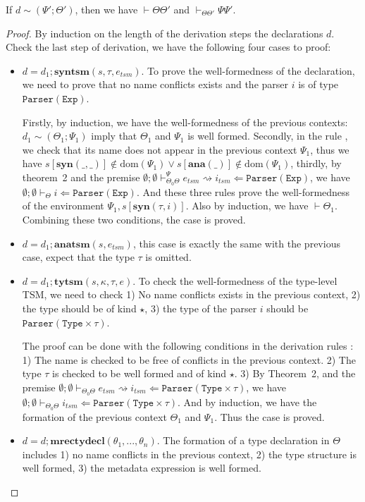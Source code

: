 \documentclass{sig-alternate}
\begin{document}
\begin{lemma} If $d\sim(\Psi';\Theta')$, then we have $\vdash\Theta\Theta'$ and $\vdash_{\Theta\Theta'}\Psi\Psi'$.
\end{lemma}
\begin{proof}
By induction on the length of the derivation steps the declarations $d$. Check the last step of derivation, we have the following four cases to proof:
\begin{itemize}
\item $d=d_1;\mathbf{syntsm}(s,\tau,e_{tsm})$. To prove the well-formedness of the declaration, we need to prove that no name conflicts exists and the parser $i$ is of type $\mathtt{Parser}(\mathtt{Exp})$. 

Firstly, by induction, we have the well-formedness of the previous contexts: $d_1\sim(\Theta_1;\Psi_1)$ imply that $\Theta_1$ and $\Psi_1$ is well formed. Secondly, in the rule , we check that its name does not appear in the previous context $\Psi_1$, thus we have $s[\mathbf{syn}(\_,\_)]\notin\text{dom}(\Psi_1)\lor s[\mathbf{ana}(\_)]\notin\text{dom}(\Psi_1)$, thirdly, by theorem~2 and the premise $\emptyset;\emptyset\vdash_{\Theta_0\Theta}^{\Psi}e_{tsm}\rightsquigarrow i_{tsm} \Leftarrow \mathtt{Parser(Exp)}$, we have $\emptyset;\emptyset\vdash_{\Theta}i\Leftarrow\mathtt{Parser}(\mathtt{Exp})$. And these three rules prove the well-formedness of the environment $\Psi_1,s[\mathbf{syn}(\tau,i)]$. Also by induction, we have $\vdash\Theta_1$. Combining these two conditions, the case is proved.
\item $d=d_1;\mathbf{anatsm}(s,e_{tsm})$, this case is exactly the same with the previous case, expect that the type $\tau$ is omitted.
\item $d=d_1;\mathbf{tytsm}(s,\kappa,\tau,e)$. To check the well-formedness of the type-level TSM, we need to check 1) No name conflicts exists in the previous context, 2) the type should be of kind $\star$, 3) the type of the parser $i$ should be $\mathtt{Parser}(\mathtt{Type}\times\tau)$.

The proof can be done with the following conditions in the derivation rules : 1) The name is checked to be free of conflicts in the previous context. 2) The type $\tau$ is checked to be well formed and of kind $\star$. 3) By Theorem~2, and the premise $\emptyset;\emptyset\vdash_{\Theta_0\Theta}e_{tsm}\rightsquigarrow i_{tsm}\Leftarrow \mathtt{Parser}(\mathtt{Type}\times\tau)$, we have  $\emptyset;\emptyset\vdash_{\Theta_0\Theta} i_{tsm}\Leftarrow \mathtt{Parser}(\mathtt{Type}\times\tau)$. And by induction, we have the formation of the previous context $\Theta_1$ and $\Psi_1$. Thus the case is proved.
\item $d=d;\mathbf{mrectydecl}(\theta_1,...,\theta_n)$. The formation of a type declaration in $\Theta$ includes 1) no name conflicts in the previous context, 2) the type structure is well formed, 3) the metadata expression is well formed.


\end{itemize}
\end{proof}
\end{document}

